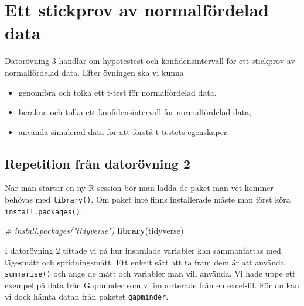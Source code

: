 \documentclass[
]{book}
\newenvironment{Shaded}{\begin{snugshade}}{\end{snugshade}}
\newcommand{\CommentTok}[1]{\textcolor[rgb]{0.56,0.35,0.01}{\textit{#1}}}
\newcommand{\FunctionTok}[1]{\textcolor[rgb]{0.13,0.29,0.53}{\textbf{#1}}}
\newcommand{\NormalTok}[1]{#1}
\providecommand{\tightlist}{%
  \setlength{\itemsep}{0pt}\setlength{\parskip}{0pt}}
\theoremstyle{definition}
\theoremstyle{definition}
\theoremstyle{definition}
\theoremstyle{definition}
\theoremstyle{remark}
\begin{document}
\chapter{Ett stickprov av normalfördelad data}\label{ett-stickprov-av-normalfuxf6rdelad-data}

Datorövning 3 handlar om hypotestest och konfidensintervall för ett stickprov av normalfördelad data. Efter övningen ska vi kunna

\begin{itemize}
\tightlist
\item
  genomföra och tolka ett t-test för normalfördelad data,
\item
  beräkna och tolka ett konfidensintervall för normalfördelad data,
\item
  använda simulerad data för att förstå t-testets egenskaper.
\end{itemize}

\section{Repetition från datorövning 2}\label{repetition-fruxe5n-datoruxf6vning-2}

När man startar en ny R-session bör man ladda de paket man vet kommer behövas med \texttt{library()}. Om paket inte finns installerade måste man först köra \texttt{install.packages()}.

\begin{Shaded}
\begin{Highlighting}[]
\CommentTok{\# install.packages("tidyverse")}
\FunctionTok{library}\NormalTok{(tidyverse)}
\end{Highlighting}
\end{Shaded}

I datorövning 2 tittade vi på hur insamlade variabler kan sammanfattas med lägesmått och spridningsmått. Ett enkelt sätt att ta fram dem är att använda \texttt{summarise()} och ange de mått och variabler man vill använda. Vi hade uppe ett exempel på data från Gapminder som vi importerade från en excel-fil. För nu kan vi dock hämta datan från paketet \texttt{gapminder}.
\end{document}
